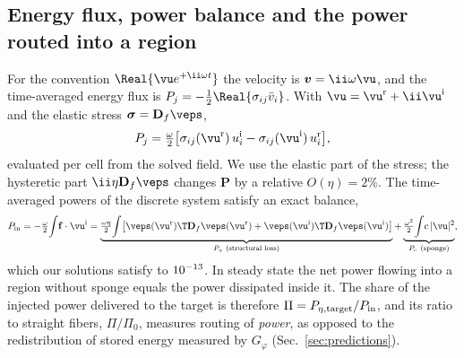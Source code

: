 \subsection{Energy flux, power balance and the power routed into a region}\label{sec:power}
For the convention $\Real\{\vu e^{+\ii\omega t}\}$ the velocity is $\bm v=\ii\omega\vu$, and the
time-averaged energy flux is $P_j=-\tfrac12\Real\{\sigma_{ij}\bar v_i\}$. With $\vu=\vu^{\rm r}+\ii\vu^{\rm i}$
and the elastic stress $\bm\sigma=\mathbf D_f\veps$,
\begin{equation}
P_j=\tfrac{\omega}{2}\big[\sigma_{ij}(\vu^{\rm r})\,u^{\rm i}_i-\sigma_{ij}(\vu^{\rm i})\,u^{\rm r}_i\big],
\label{eq:flux}
\end{equation}
evaluated per cell from the solved field. We use the elastic part of the stress; the hysteretic part
$\ii\eta\mathbf D_f\veps$ changes $\bm P$ by a relative $O(\eta)=2\%$. The time-averaged powers of the
discrete system satisfy an exact balance,
\begin{equation}
P_{\rm in}=-\tfrac{\omega}{2}\!\int\!\mathbf f\cdot\vu^{\rm i}
=\underbrace{\tfrac{\omega\eta}{2}\!\int\!\big[\veps(\vu^{\rm r})\T\mathbf D_f\veps(\vu^{\rm r})
+\veps(\vu^{\rm i})\T\mathbf D_f\veps(\vu^{\rm i})\big]}_{P_\eta\ \text{(structural loss)}}
+\underbrace{\tfrac{\omega^2}{2}\!\int\!c\,|\vu|^2}_{P_c\ \text{(sponge)}},
\label{eq:balance}
\end{equation}
which our solutions satisfy to $10^{-13}$. In steady state the net power flowing into a region
without sponge equals the power dissipated inside it. The share of the injected power delivered to
the target is therefore $\Pi=P_{\eta,\rm target}/P_{\rm in}$, and its ratio to straight fibers,
$\Pi/\Pi_0$, measures routing of \emph{power}, as opposed to the redistribution of stored energy
measured by $G_\varphi$ (Sec.~\ref{sec:predictions}).

